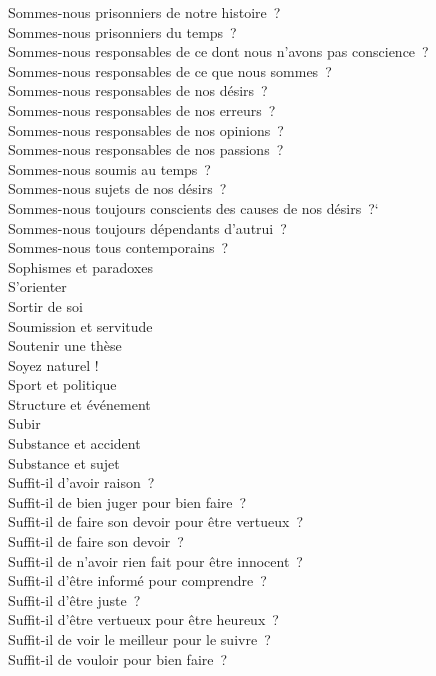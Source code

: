 \documentclass[a4paper,12pt]{article}
\begin{document}
Sommes-nous prisonniers de notre histoire ? \\
Sommes-nous prisonniers du temps ? \\
Sommes-nous responsables de ce dont nous n'avons pas conscience ? \\
Sommes-nous responsables de ce que nous sommes ? \\
Sommes-nous responsables de nos désirs ? \\
Sommes-nous responsables de nos erreurs ? \\
Sommes-nous responsables de nos opinions ? \\
Sommes-nous responsables de nos passions ? \\
Sommes-nous soumis au temps ? \\
Sommes-nous sujets de nos désirs ? \\
Sommes-nous toujours conscients des causes de nos désirs ?` \\
Sommes-nous toujours dépendants d'autrui ? \\
Sommes-nous tous contemporains ? \\
Sophismes et paradoxes \\
S'orienter \\
Sortir de soi \\
Soumission et servitude \\
Soutenir une thèse \\
Soyez naturel ! \\
Sport et politique \\
Structure et événement \\
Subir \\
Substance et accident \\
Substance et sujet \\
Suffit-il d'avoir raison ? \\
Suffit-il de bien juger pour bien faire ? \\
Suffit-il de faire son devoir pour être vertueux ? \\
Suffit-il de faire son devoir ? \\
Suffit-il de n'avoir rien fait pour être innocent ? \\
Suffit-il d'être informé pour comprendre ? \\
Suffit-il d'être juste ? \\
Suffit-il d'être vertueux pour être heureux ? \\
Suffit-il de voir le meilleur pour le suivre ? \\
Suffit-il de vouloir pour bien faire ? \\
\end{document}
